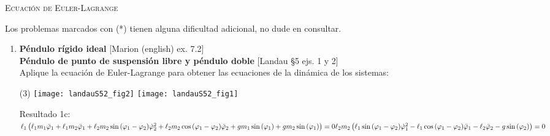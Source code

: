 \documentclass[11pt, a4paper, twoside]{article}
\begin{document}
\begin{center}
  \textsc{\large Ecuación de Euler-Lagrange}
\end{center}

\noindent
Los problemas marcados con (*) tienen alguna dificultad adicional, no dude en consultar.
\begin{enumerate} 


\item
\textbf{Péndulo rígido ideal} [Marion (english) ex. 7.2] \\
\textbf{Péndulo de punto de suspensión libre y péndulo doble} [Landau \S5 ejs. 1 y 2]\\ 
Aplique la ecuación de Euler-Lagrange para obtener las ecuaciones de la dinámica de los sistemas:
\begin{tasks}(3)
	\task 
	\task \texttt{[image: landauS52\_fig2]}
	\task \texttt{[image: landauS52\_fig1]}
\end{tasks}
Resultado 1c:\\
\(
\ell_{1} \left(\ell_{1} m_{1} \ddot{\varphi}_{1} + \ell_{1} m_{2} \ddot{\varphi}_{1} + \ell_{2} m_{2} \sin{\left(\varphi_{1} - \varphi_{2} \right)} \dot{\varphi}_{2}^{2} + \ell_{2} m_{2} \cos{\left(\varphi_{1} - \varphi_{2} \right)} \ddot{\varphi}_{2} + g m_{1} \sin{\left(\varphi_{1} \right)} + g m_{2} \sin{\left(\varphi_{1} \right)}\right) = 0\\
\ell_{2} m_{2} \left(\ell_{1} \sin{\left(\varphi_{1} - \varphi_{2} \right)} \dot{\varphi}_{1}^{2} - \ell_{1} \cos{\left(\varphi_{1} - \varphi_{2} \right)} \ddot{\varphi}_{1} - \ell_{2} \ddot{\varphi}_{2} - g \sin{\left(\varphi_{2} \right)}\right) = 0
\)



\end{enumerate}
\end{document}
